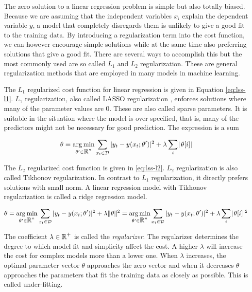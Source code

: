 The zero solution to a linear regression problem is simple but also
totally biased. Because we are assuming that the independent variables
$x_i$ explain the dependent variable $y$, a model that completely
disregards them is unlikely to give a good fit to the training
data. By introducing a regularization term into the cost function, we
can however encourage simple solutions while at the same time also
preferring solutions that give a good fit. There are several ways to
accomplish this but the most commonly used are so called $L_1$ and
$L_2$ regularization. These are general regularization methods that
are employed in many models in machine learning.

The $L_1$ regularized cost function for linear regression is given in
Equation \ref{eq:lss-l1}. $L_1$ regularization, also called LASSO
regularization \cite{somone}, enforces solutions where many of the
parameter values are $0$. These are also called sparse parameters. It
is suitable in the situation where the model is over specified, that
is, many of the predictors might not be necessary for good prediction. The expression is a sum 

\begin{equation}
\theta = \operatorname*{arg\,min}_{\theta' \in \mbox{$\mathbb R$}^n} \sum_{x_t \in \mathcal{D}} | y_t - y(x_t\mbox{$ ; \, $} \theta')|^2 + \lambda \sum_i |\theta[i]|\label{eq:lss-l1}
\end{equation}

The $L_2$ regularized cost function is given in \ref{eq:lss-l2}. $L_2$
regularization is also called Tikhonov regularization. In contrast to
$L_1$ regularization, it directly prefers solutions with small norm. A
linear regression model with Tikhonov regularization is called a ridge
regression model.

\begin{equation}
\theta = \operatorname*{arg\,min}_{\theta' \in \mbox{$\mathbb R$}^n} \sum_{x_t \in \mathcal{D}} | y_t - y(x_t\mbox{$ ; \, $} \theta')|^2 + \lambda \|\theta\|^2 = \operatorname*{arg\,min}_{\theta' \in \mbox{$\mathbb R$}^n} \sum_{x_t \in \mathcal{D}} | y_t - y(x_t\mbox{$ ; \, $} \theta')|^2 + \lambda \sum_i |\theta[i]|^2\label{eq:lss-l2}
\end{equation}

The coefficient $\lambda \in \mbox{$\mathbb R$}^+$ is called the {\it
  regularizer}. The regularizer determines the degree to which model
fit and simplicity affect the cost. A higher $\lambda$ will increase
the cost for complex models more than a lower one. When $\lambda$
increases, the optimal parameter vector $\theta$ approaches the zero
vector and when it decreases $\theta$ approaches the parameters that
fit the training data as closely as possible. This is called
under-fitting.

